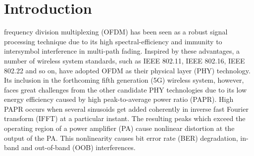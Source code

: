 \documentclass[journal,comsoc]{IEEEtran}
\begin{document}
\section{Introduction}
 frequency division multiplexing (OFDM) has been seen as a robust signal processing technique due to its high spectral-efficiency and immunity to intersymbol interference in multi-path fading.  Inspired by these advantages, a number of wireless system standards, such as IEEE 802.11, IEEE 802.16, IEEE 802.22 and so on, have adopted OFDM as their physical layer (PHY) technology. Its inclusion in the forthcoming fifth generation (5G) wireless system, however, faces great challenges from the other candidate PHY technologies due to its low energy efficiency caused by high peak-to-average power ratio (PAPR). High PAPR occurs when several sinusoids get added coherently in inverse fast Fourier transform (IFFT) at a particular instant. The resulting peaks which exceed the operating region of a power amplifier (PA) cause nonlinear distortion at the output of the PA. This nonlinearity causes bit error rate (BER) degradation, in-band and out-of-band (OOB) interferences.
\end{document}
